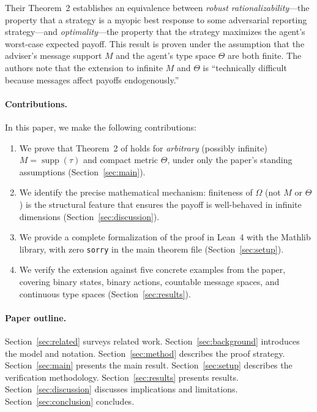 \documentclass[11pt,a4paper]{article}
\theoremstyle{definition}
\DeclareMathOperator{\supp}{supp}
\newcommand{\sorry}{\texttt{sorry}}
\begin{document}
Their Theorem~2 establishes an equivalence between \emph{robust rationalizability}---the property that a strategy is a myopic best response to some adversarial reporting strategy---and \emph{optimality}---the property that the strategy maximizes the agent's worst-case expected payoff.
This result is proven under the assumption that the adviser's message support $M$ and the agent's type space $\Theta$ are both finite.
The authors note that the extension to infinite $M$ and $\Theta$ is ``technically difficult because messages affect payoffs endogenously.''

\paragraph{Contributions.}
In this paper, we make the following contributions:
\begin{enumerate}[leftmargin=*]
  \item We prove that Theorem~2 of \citet{dworczak2026robust} holds for \emph{arbitrary} (possibly infinite) $M = \supp(\tau)$ and compact metric $\Theta$, under only the paper's standing assumptions (Section~\ref{sec:main}).
  \item We identify the precise mathematical mechanism: finiteness of $\Omega$ (not $M$ or $\Theta$) is the structural feature that ensures the payoff is well-behaved in infinite dimensions (Section~\ref{sec:discussion}).
  \item We provide a complete formalization of the proof in Lean~4 with the Mathlib library, with zero \sorry{} in the main theorem file (Section~\ref{sec:setup}).
  \item We verify the extension against five concrete examples from the paper, covering binary states, binary actions, countable message spaces, and continuous type spaces (Section~\ref{sec:results}).
\end{enumerate}

\paragraph{Paper outline.}
Section~\ref{sec:related} surveys related work.
Section~\ref{sec:background} introduces the model and notation.
Section~\ref{sec:method} describes the proof strategy.
Section~\ref{sec:main} presents the main result.
Section~\ref{sec:setup} describes the verification methodology.
Section~\ref{sec:results} presents results.
Section~\ref{sec:discussion} discusses implications and limitations.
Section~\ref{sec:conclusion} concludes.
\end{document}
